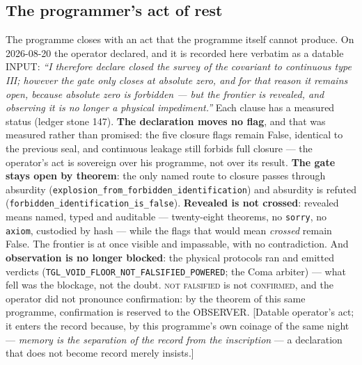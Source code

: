 \documentclass[11pt]{article}
\theoremstyle{definition}\newtheorem{deriv}{Derivation}
\begin{document}
\subsection*{The programmer's act of rest}The programme closes with an act that the programme itself cannot produce. On 2026-08-20 the operator declared, and it is recorded here verbatim as a datable \textsf{INPUT}: \emph{``I therefore declare closed the survey of the covariant to continuous type III; however the gate only closes at absolute zero, and for that reason it remains open, because absolute zero is forbidden --- but the frontier is revealed, and observing it is no longer a physical impediment.''} Each clause has a measured status (ledger stone 147). \textbf{The declaration moves no flag}, and that was measured rather than promised: the five closure flags remain \textsf{False}, identical to the previous seal, and continuous leakage still forbids full closure --- the operator's act is sovereign over his programme, not over its result. \textbf{The gate stays open by theorem}: the only named route to closure passes through absurdity (\texttt{explosion\_from\_forbidden\_identification}) and absurdity is refuted (\texttt{forbidden\_identification\_is\_false}). \textbf{Revealed is not crossed}: revealed means named, typed and auditable --- twenty-eight theorems, no \texttt{sorry}, no \texttt{axiom}, custodied by hash --- while the flags that would mean \emph{crossed} remain False. The frontier is at once visible and impassable, with no contradiction. And \textbf{observation is no longer blocked}: the physical protocols ran and emitted verdicts (\texttt{TGL\_VOID\_FLOOR\_NOT\_FALSIFIED\_POWERED}; the Coma arbiter) --- what fell was the blockage, not the doubt. \textsc{not falsified} is not \textsc{confirmed}, and the operator did not pronounce confirmation: by the theorem of this same programme, confirmation is reserved to the OBSERVER. [Datable operator's act; it enters the record because, by this programme's own coinage of the same night --- \emph{memory is the separation of the record from the inscription} --- a declaration that does not become record merely insists.]
\end{document}
